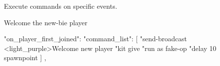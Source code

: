 \label{ch:command_event}

Execute commands on specific events.


\begin{example}{Welcome the new-bie player}
    \begin{json}
        "on_player_first_joined": {
            "command_list": [
            "send-broadcast <light_purple>Welcome new player %
            "kit give %
            "run as fake-op %
            "delay 10 spawnpoint %
            ]
        },
    \end{json}
\end{example}
